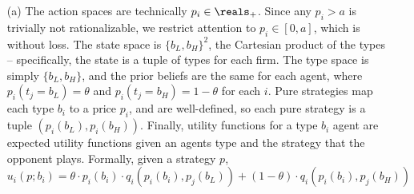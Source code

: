 \documentclass[10pt]{article}
\begin{document}
\begin{itemize}
	\item[(a)] The action spaces are technically $p_i \in \reals_+$. Since any $p_i > a$ is trivially not rationalizable, we restrict attention to $p_i \in [0,a]$, which is without loss. The state space is $\{b_L,b_H\}^2$, the Cartesian product of the types -- specifically, the state is a tuple of types for each firm. The type space is simply $\{b_L,b_H\}$, and the prior beliefs are the same for each agent, where $p_i(t_j = b_L) = \theta$ and $p_i(t_j = b_H) = 1-\theta$ for each $i$. Pure strategies map each type $b_i$ to a price $p_i$, and are well-defined, so each pure strategy is a tuple $(p_i(b_L),p_i(b_H))$. Finally, utility functions for a type $b_i$ agent are expected utility functions given an agents type and the strategy that the opponent plays. Formally, given a strategy $p$, \[u_i(p; b_i) = \theta\cdot  p_i(b_i) \cdot q_i(p_i(b_i),p_j(b_L)) + (1-\theta) \cdot q_i(p_i(b_i),p_j(b_H))\]

\end{itemize}
\end{document}
